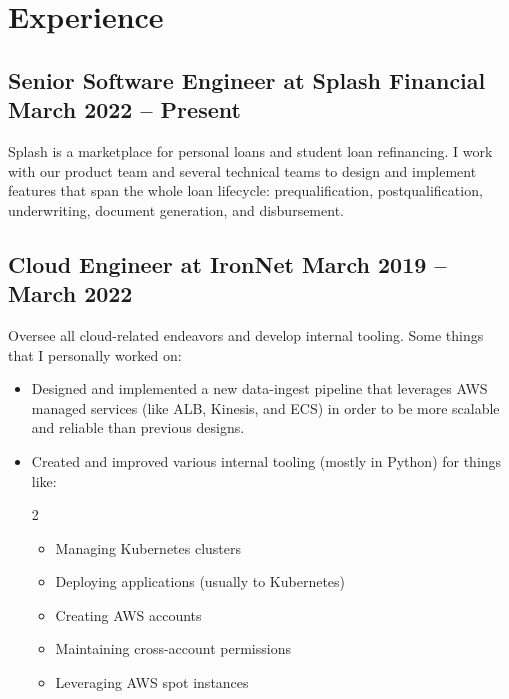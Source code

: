 \documentclass[12pt]{article}
\begin{document}

\section*{Experience}

\subsection*{Senior Software Engineer at Splash Financial \hfill March 2022 -- Present}

Splash is a marketplace for personal loans and student loan refinancing. I work
with our product team and several technical teams to design and implement
features that span the whole loan lifecycle: prequalification,
postqualification, underwriting, document generation, and disbursement.

     

\subsection*{Cloud Engineer at IronNet \hfill March 2019 -- March 2022}

Oversee all cloud-related endeavors and develop internal tooling. Some things
that I personally worked on:

\begin{itemize}

\item Designed and implemented a new data-ingest pipeline that leverages AWS
  managed services (like ALB, Kinesis, and ECS) in order to be more scalable and
  reliable than previous designs.

\item Created and improved various internal tooling (mostly in Python) for
  things like:

  \begin{multicols}{2}
    \raggedright
    \begin{itemize}
    \item Managing Kubernetes clusters
    \item Deploying applications (usually to Kubernetes)
    \item Creating AWS accounts
    \item Maintaining cross-account permissions
    \item Leveraging AWS spot instances
    \end{itemize}
  \end{multicols}

\end{itemize}
\end{document}
